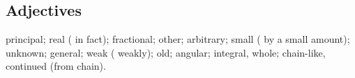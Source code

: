 \subsection*{Adjectives}
\noindent{} principal;  real ( in fact);  fractional;  other;  arbitrary;  small ( by a small amount);  unknown;  general;  weak ( weakly);  old;  angular;  integral, whole;  chain-like, continued (from  chain).

\fussy
